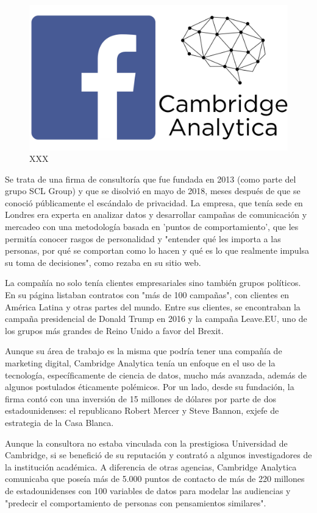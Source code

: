 \begin{figure}[ht!]
    \includegraphics[width=\textwidth]{images/analytica.jpg}
    \caption{XXX}
    \label{analytic}
\end{figure}

Se trata de una firma de consultoría que fue fundada en 2013 (como parte del grupo SCL Group) y que se disolvió en mayo de 2018, meses después de que se conoció públicamente el escándalo de privacidad. La empresa, que tenía sede en Londres era experta en analizar datos y desarrollar campañas de comunicación y mercadeo con una metodología basada en 'puntos de comportamiento', que les permitía conocer rasgos de personalidad y "entender qué les importa a las personas, por qué se comportan como lo hacen y qué es lo que realmente impulsa su toma de decisiones", como rezaba en su sitio web.

La compañía no solo tenía clientes empresariales sino también grupos políticos. En su página listaban contratos con "más de 100 campañas", con clientes en América Latina y otras partes del mundo. Entre sus clientes, se encontraban la campaña presidencial de Donald Trump en 2016 y la campaña Leave.EU, uno de los grupos más grandes de Reino Unido a favor del Brexit.

Aunque su área de trabajo es la misma que podría tener una compañía de marketing digital, Cambridge Analytica tenía un enfoque en el uso de la tecnología, específicamente de ciencia de datos, mucho más avanzada, además de algunos postulados éticamente polémicos.  Por un lado, desde su fundación, la firma contó con una inversión de 15 millones de dólares por parte de dos estadounidenses: el republicano Robert Mercer y Steve Bannon, exjefe de estrategia de la Casa Blanca.

Aunque la consultora no estaba vinculada con la prestigiosa Universidad de Cambridge, si se benefició de su reputación y contrató a algunos investigadores de la institución académica. A diferencia de otras agencias, Cambridge Analytica comunicaba que poseía más de 5.000 puntos de contacto de más de 220 millones de estadounidenses con 100 variables de datos para modelar las audiencias y "predecir el comportamiento de personas con pensamientos similares".

